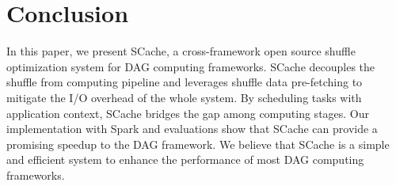 \section{Conclusion}
 In this paper, we present SCache, a cross-framework open source shuffle optimization system for DAG computing frameworks. SCache decouples the shuffle from computing pipeline and leverages shuffle data pre-fetching to mitigate the I/O overhead of the whole system. By scheduling tasks with application context, SCache bridges the gap among computing stages. Our implementation with Spark and evaluations show that SCache can provide a promising speedup to the DAG framework. We believe that SCache is a simple and efficient system to enhance the performance of most DAG computing frameworks. 